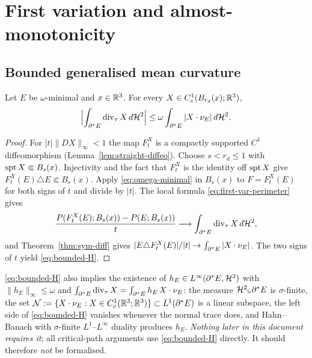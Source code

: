 \chapter{First variation and almost-monotonicity}\label{ch:monotonicity}

\section{Bounded generalised mean curvature}

\begin{lemma}\label{lem:bounded-H}
Let $E$ be $\omega$-minimal and $x\in\mathbb R^3$.  For every
$X\in C^1_c(B_{r_d}(x);\mathbb R^3)$,
\begin{equation}\label{eq:bounded-H}
  \Bigl|\int_{\partial^* E}\operatorname{div}_\tau X\,d\mathcal H^2\Bigr|
  \le\omega\int_{\partial^* E}|X\cdot\nu_E|\,d\mathcal H^2 .
\end{equation}
\end{lemma}

\begin{proof}
For $|t|\|DX\|_\infty<1$ the map $F^X_t$ is a compactly supported $C^1$
diffeomorphism (Lemma~\ref{lem:straight-diffeo}).  Choose
$s<r_d\le1$ with $\operatorname{spt} X\Subset B_s(x)$.  Injectivity and the fact that
$F_t^X$ is the identity off $\operatorname{spt} X$ give
$F_t^X(E)\triangle E\Subset B_s(x)$.  Apply \eqref{eq:omega-minimal} in
$B_s(x)$ to $F=F^X_t(E)$ for both signs of $t$ and divide by $|t|$.
The local formula \eqref{eq:first-var-perimeter} gives
\[
 \frac{P(F^X_t(E);B_s(x))-P(E;B_s(x))}{t}
 \longrightarrow\int_{\partial^* E}\operatorname{div}_\tau X\,d\mathcal H^2,
\]
and
Theorem~\ref{thm:sym-diff} gives
$|E\triangle F^X_t(E)|/|t|\to\int_{\partial^* E}|X\cdot\nu_E|$.  The two signs of
$t$ yield \eqref{eq:bounded-H}.
\end{proof}

\begin{remark}\label{rem:hE-optional}
\eqref{eq:bounded-H} also implies the existence of
$h_E\in L^\infty(\partial^* E,\mathcal H^2)$ with $\|h_E\|_\infty\le\omega$ and
$\int_{\partial^* E}\operatorname{div}_\tau X=\int_{\partial^* E}h_E\,X\cdot\nu_E$: the measure
$\mathcal H^2\llcorner\partial^* E$ is $\sigma$-finite, the set
$\mathcal N:=\{X\cdot\nu_E:X\in C^1_c(\mathbb R^3;\mathbb R^3)\}\subset L^1(\partial^* E)$ is a
linear subspace, the left side of \eqref{eq:bounded-H} vanishes whenever the
normal trace does, and Hahn--Banach with $\sigma$-finite $L^1$--$L^\infty$
duality produces $h_E$.  \emph{Nothing later in this document requires it};
all critical-path arguments use \eqref{eq:bounded-H} directly.  It should
therefore \emph{not} be formalised.
\end{remark}

